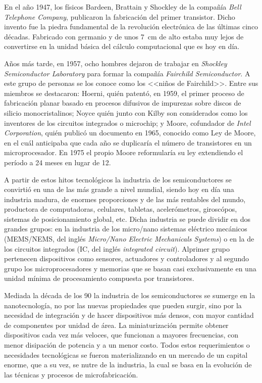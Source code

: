 		En el año 1947, los físicos Bardeen, Brattain  y Shockley de la compañía \textit{Bell Telephone Company}, publicaron la fabricación del primer transistor. Dicho invento fue la piedra fundamental de la revolución electrónica de las últimas cinco décadas. Fabricado con germanio y de unos \SI{7}{cm} de alto estaba muy lejos de convertirse en la unidad básica del cálculo computacional que es hoy en día. \cite{riordan1999} 

		Años más tarde, en 1957, ocho hombres dejaron de trabajar en \textit{Shockley Semiconductor Laboratory} para formar la compañía \textit{Fairchild Semiconductor}. A este grupo de personas se los conoce como los <<niños de Fairchild>>. Entre sus miembros se destacaron: Hoerni, quién patentó, en 1959, el primer proceso de fabricación planar basado en   procesos difusivos de impurezas sobre discos de silicio monocristalinos; Noyce quién junto con Kilby son considerados como los inventores de los circuitos integrados o microchip; y Moore, cofundador de \textit{Intel Corporation}, quién publicó un documento en 1965, conocido como Ley de Moore, en el cuál anticipaba que cada año se duplicaría el número de transistores en un microprocesador. En 1975 el propio Moore reformularía su ley extendiendo el período a 24 meses en lugar de 12. \cite{moore2006,riordan1999,fagen1984}

		A partir de estos hitos tecnológicos la industria de los semiconductores se convirtió en una de las más grande a nivel mundial, siendo hoy en día una industria madura, de enormes proporciones y de las más rentables del mundo, productora de computadoras, celulares, tabletas, acelerómetros, giroscópos, sistemas de posicionamiento global, etc. Dicha industria se puede dividir en dos grandes grupos: en la industria de los micro/nano sistemas eléctrico mecánicos (MEMS/NEMS, del inglés \textit{Micro/Nano Electric Mechanicals Systems}) o en la de los circuitos integrados (IC, del inglés \textit{integrated circuit}). Al\space primer grupo pertenecen dispositivos como sensores, actuadores y controladores y al segundo grupo los microprocesadores y memorias que se basan casi exclusivamente en una unidad mínima de procesamiento compuesta por transistores.\cite{Franssila2004,Jaeger2001,Madou2002}

 		Mediada la década de los 90 la industria de los semiconductores se sumerge en la nanotecnología, no por las nuevas propiedades que pueden surgir, sino por la necesidad de integración y de hacer dispositivos más densos, con mayor cantidad de componentes por unidad de área. La miniaturización permite obtener dispositivos cada vez más  veloces, que funcionan a mayores frecuencias, con menor disipación de potencia y a un menor costo. Todos estos requerimientos o necesidades tecnológicas se fueron materializando en un mercado de un capital enorme, que a su vez, se nutre de la industria, la cual se basa en la evolución de las técnicas y procesos de microfabricación.

